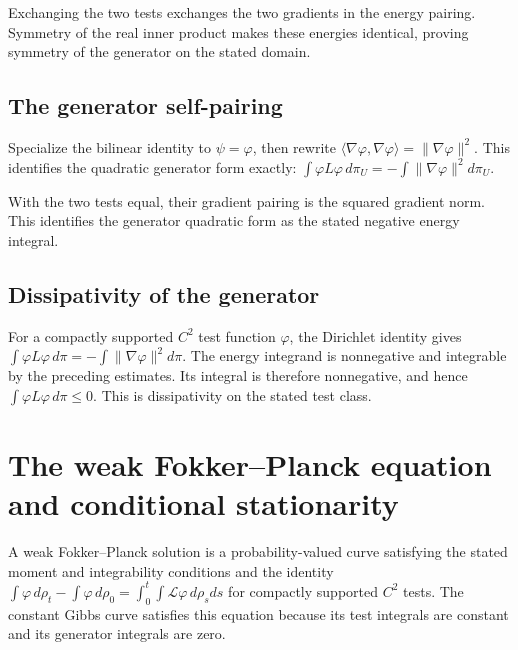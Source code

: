 \documentclass[11pt,a4paper]{report}
\begin{document}
Exchanging the two tests exchanges the two gradients in the energy pairing. Symmetry of the real inner product makes these energies identical, proving symmetry of the generator on the stated domain.

\subsection{\texorpdfstring{The generator self-pairing}{The generator self-pairing}}
\label{report-step-UnadjustedLangevin-GeneratorDirichlet-lean-8}


Specialize the bilinear identity to \(\psi=\varphi\), then rewrite \(\langle\nabla\varphi,\nabla\varphi\rangle=\|\nabla\varphi\|^2\). This identifies the quadratic generator form exactly: \(\int\varphi L\varphi\,d\pi_U=-\int\|\nabla\varphi\|^2d\pi_U\).



With the two tests equal, their gradient pairing is the squared gradient norm. This identifies the generator quadratic form as the stated negative energy integral.

\subsection{\texorpdfstring{Dissipativity of the generator}{Dissipativity of the generator}}
\label{report-step-UnadjustedLangevin-GeneratorDirichlet-lean-9}


For a compactly supported \(C^2\) test function \(\varphi\), the Dirichlet identity gives \(\int\varphi L\varphi\,d\pi=-\int\|\nabla\varphi\|^2d\pi\). The energy integrand is nonnegative and integrable by the preceding estimates. Its integral is therefore nonnegative, and hence \(\int\varphi L\varphi\,d\pi\le0\). This is dissipativity on the stated test class.

\section{\texorpdfstring{The weak Fokker–Planck equation and conditional stationarity}{The weak Fokker–Planck equation and conditional stationarity}}
\label{proof-module-UnadjustedLangevin-FokkerPlanck-lean}


A weak Fokker–Planck solution is a probability-valued curve satisfying the stated moment and integrability conditions and the identity \(\int\varphi\,d\rho_t-\int\varphi\,d\rho_0=\int_0^t\int\mathcal L\varphi\,d\rho_sds\) for compactly supported \(C^2\) tests. The constant Gibbs curve satisfies this equation because its test integrals are constant and its generator integrals are zero.
\end{document}
